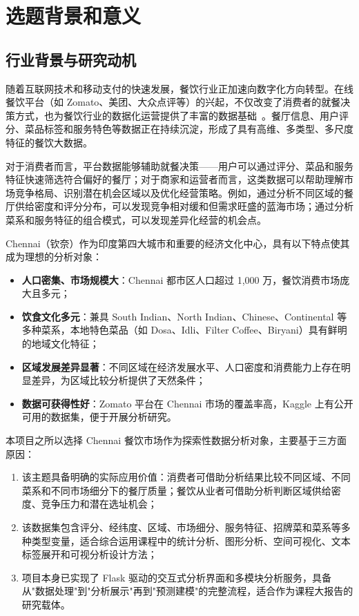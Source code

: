 \documentclass[11pt,a4paper]{article}
\begin{document}
\newpage
\tableofcontents
\newpage

\section{选题背景和意义}

\subsection{行业背景与研究动机}

随着互联网技术和移动支付的快速发展，餐饮行业正加速向数字化方向转型。在线餐饮平台（如 Zomato、美团、大众点评等）的兴起，不仅改变了消费者的就餐决策方式，也为餐饮行业的数据化运营提供了丰富的数据基础~\cite{zomato}。餐厅信息、用户评分、菜品标签和服务特色等数据正在持续沉淀，形成了具有高维、多类型、多尺度特征的餐饮大数据。

对于消费者而言，平台数据能够辅助就餐决策——用户可以通过评分、菜品和服务特征快速筛选符合偏好的餐厅；对于商家和运营者而言，这类数据可以帮助理解市场竞争格局、识别潜在机会区域以及优化经营策略。例如，通过分析不同区域的餐厅供给密度和评分分布，可以发现竞争相对缓和但需求旺盛的蓝海市场；通过分析菜系和服务特征的组合模式，可以发现差异化经营的机会点。

Chennai（钦奈）作为印度第四大城市和重要的经济文化中心，具有以下特点使其成为理想的分析对象：
\begin{itemize}[leftmargin=2em]
    \item \textbf{人口密集、市场规模大}：Chennai 都市区人口超过 1,000 万，餐饮消费市场庞大且多元；
    \item \textbf{饮食文化多元}：兼具 South Indian、North Indian、Chinese、Continental 等多种菜系，本地特色菜品（如 Dosa、Idli、Filter Coffee、Biryani）具有鲜明的地域文化特征；
    \item \textbf{区域发展差异显著}：不同区域在经济发展水平、人口密度和消费能力上存在明显差异，为区域比较分析提供了天然条件；
    \item \textbf{数据可获得性好}：Zomato 平台在 Chennai 市场的覆盖率高，Kaggle 上有公开可用的数据集，便于开展分析研究。
\end{itemize}

本项目之所以选择 Chennai 餐饮市场作为探索性数据分析对象，主要基于三方面原因：
\begin{enumerate}[leftmargin=2em]
    \item 该主题具备明确的实际应用价值：消费者可借助分析结果比较不同区域、不同菜系和不同市场细分下的餐厅质量；餐饮从业者可借助分析判断区域供给密度、竞争压力和潜在选址机会；
    \item 该数据集包含评分、经纬度、区域、市场细分、服务特征、招牌菜和菜系等多种类型变量，适合综合运用课程中的统计分析、图形分析、空间可视化、文本标签展开和可视分析设计方法；
    \item 项目本身已实现了 Flask 驱动的交互式分析界面和多模块分析服务，具备从"数据处理"到"分析展示"再到"预测建模"的完整流程，适合作为课程大报告的研究载体。
\end{enumerate}
\end{document}
